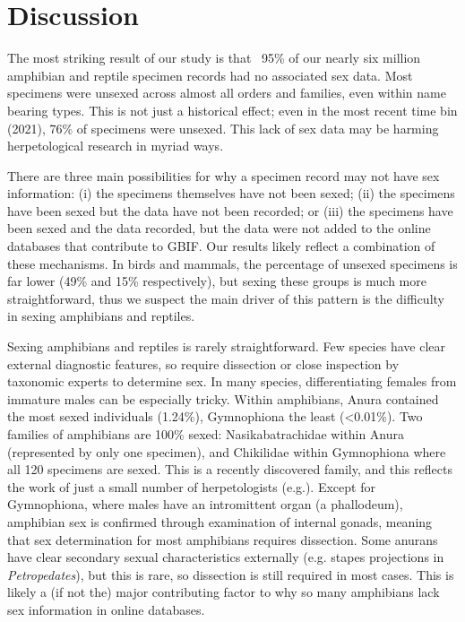 \documentclass[a4paper, 12pt]{article}
\begin{document}
\section{Discussion}

The most striking result of our study is that ~95\% of our nearly six million amphibian and reptile specimen records had no associated sex data. 
Most specimens were unsexed across almost all orders and families, even within name bearing types. 
This is not just a historical effect; even in the most recent time bin (2021), 76\% of specimens were unsexed. 
This lack of sex data may be harming herpetological research in myriad ways.

There are three main possibilities for why a specimen record may not have sex information: (i) the specimens themselves have not been sexed; (ii) the specimens have been sexed but the data have not been recorded; or (iii) the specimens have been sexed and the data recorded, but the data were not added to the online databases that contribute to GBIF.  
Our results likely reflect a combination of these mechanisms. 
In birds and mammals, the percentage of unsexed specimens is far lower (49\% and 15\% respectively\cite{cooper2019sex}), but sexing these groups is much more straightforward, thus we suspect the main driver of this pattern is the difficulty in sexing amphibians and reptiles.

Sexing amphibians and reptiles is rarely straightforward. 
Few species have clear external diagnostic features, so require dissection or close inspection by taxonomic experts to determine sex. 
In many species, differentiating females from immature males can be especially tricky. 
Within amphibians, Anura contained the most sexed individuals (1.24\%), Gymnophiona the least (<0.01\%).
Two families of amphibians are 100\% sexed: Nasikabatrachidae within Anura (represented by only one specimen), and Chikilidae within Gymnophiona where all 120 specimens are sexed.
This is a recently discovered family, and this reflects the work of just a small number of herpetologists (e.g.\cite{kamei2012discovery}).
Except for Gymnophiona, where males have an intromittent organ (a phallodeum), amphibian sex is confirmed through examination of internal gonads, meaning that sex determination for most amphibians requires dissection.
Some anurans have clear secondary sexual characteristics externally (e.g. stapes projections in \textit{Petropedates}), but this is rare, so dissection is still required in most cases. 
This is likely a (if not the) major contributing factor to why so many amphibians lack sex information in online databases.  
\end{document}

